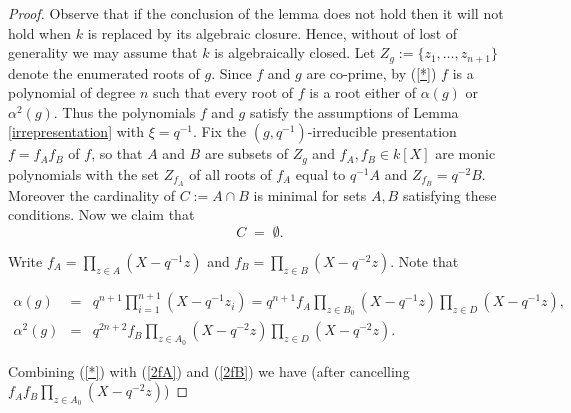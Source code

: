 \documentclass[10pt,a4paper]{amsart}
\begin{document}
\begin{proof}
Observe that if the conclusion of the lemma does not hold then it will not hold when $k$ is replaced by its algebraic closure. Hence, without of lost of  generality we may assume that $k$ is algebraically closed. Let  $Z_g:=\{z_1,\ldots, z_{n+1}\}$ denote the enumerated roots of $g$.  Since $f$ and $g$ are co-prime, by (\ref{*}) $f$ is a polynomial of degree $n$ such that every root of $f$ is a root either of $\alpha(g) $ or $\alpha^2(g) $. Thus the polynomials $f$ and $g$ satisfy the assumptions of Lemma \ref{irrepresentation} with $\xi=q^{-1}$. Fix the $(g,q^{-1})$-irreducible presentation $f=f_Af_B$ of $f$, so that $A$ and $B$ are  subsets of  $Z_g$ and  $f_A, f_B\in k[X]$ are monic polynomials  with the set $Z_{f_A}$ of all roots of  $f_A$ equal to $q^{-1}A$ and $Z_{f_B}=q^{-2}B$. Moreover the cardinality of  $C:=A\cap B$ is minimal for sets $A,B$ satisfying these conditions. Now we claim that 
\begin{equation}\label{Cempty} C\; =\; \emptyset.
\end{equation}

Write  $f_A=\prod_{z\in A}(X-q^{-1}z)$ and $f_B=\prod_{z\in B}(X-q^{-2}z)$. Note that

\begin{eqnarray}
\alpha(g) &=& q^{n+1}\prod_{i=1}^{n+1}(X-q^{-1}z_i)=q^{n+1}f_A\prod_{z\in B_0}(X-q^{-1}z)\prod_{z\in D}(X-q^{-1}z)\label{2fA},\\
\alpha^2(g) &=& q^{2n+2}f_B\prod_{z\in A_0}(X-q^{-2}z)\prod_{z\in D}(X-q^{-2}z).\label{2fB}
\end{eqnarray}

\noindent Combining (\ref{*}) with (\ref{2fA}) and (\ref{2fB}) we have (after cancelling $f_Af_B\prod_{z\in A_0}(X - q^{-2}z)$)



\end{proof}
\end{document}
